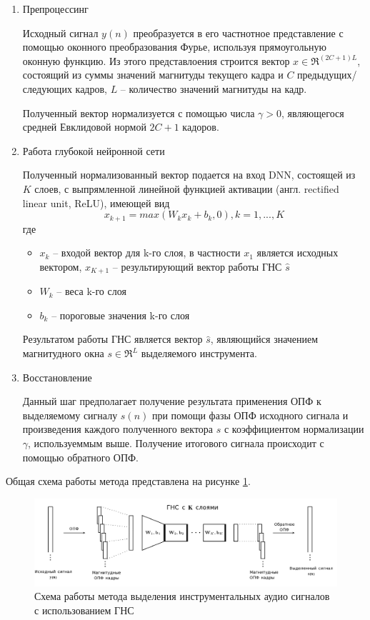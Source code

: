 \begin{enumerate}
	\item Препроцессинг
	
	Исходный сигнал $y(n)$ преобразуется в его частнотное представление с помощью оконного преобразования Фурье, используя прямоугольную оконную функцию. Из этого представлоения строится вектор $x \in \Re^{(2C+1)L}$, состоящий из суммы значений магнитуды текущего кадра и $C$ предыдущих/следующих кадров, $L$ -- количество значений магнитуды на кадр.
	
	Полученный вектор нормализуется с помощью числа $\gamma > 0$, являющегося средней Евклидовой нормой $2C+1$ кадоров.
	
	\item Работа глубокой нейронной сети
	
	Полученный нормализованный вектор подается на вход DNN, состоящей из $K$ слоев, с выпрямленной линейной функцией активации (англ. rectified linear unit, ReLU), имеющей вид
	\begin{equation}
	x_{k+1} = max(W_k x_k + b_k , 0), k = 1, ..., K
	\label{anal:relu}
	\end{equation}
	где 
	\begin{itemize}
		\item $x_k$ -- входой вектор для k-го слоя, в частности $x_1$ является исходных вектором, $x_{K+1}$ -- результирующий вектор работы ГНС $\hat s$
		\item $W_k$ -- веса k-го слоя
		\item $b_k$ -- пороговые значения k-го слоя
	\end{itemize}

	Результатом работы ГНС является вектор $\hat s$, являющийся значением магнитудного окна $s \in \Re^L$ выделяемого инструмента.
	
	\item Восстановление
	
	Данный шаг предполагает получение результата применения ОПФ к выделяемому сигналу $s(n)$ при помощи фазы ОПФ исходного сигнала и произведения каждого полученного вектора $\hat{s}$ с коэффициентом нормализации $\gamma$, используеммым выше. Получение итогового сигнала происходит с помощью обратного ОПФ.
	
\end{enumerate}

Общая схема работы метода представлена на рисунке \ref{anal:DNN-inst}.

\begin{figure}
	\centering
	\includegraphics[width=\textwidth]{inc/img/DNN-inst.png}
	\caption{Схема работы метода выделения инструментальных аудио сигналов с использованием ГНС}
	\label{anal:DNN-inst}
\end{figure}

